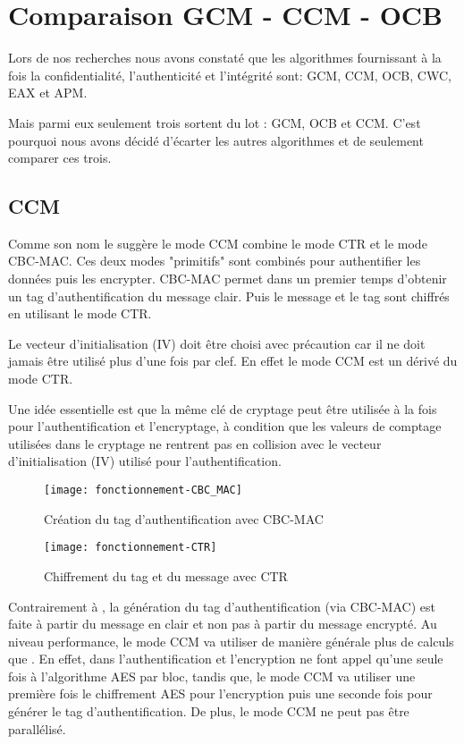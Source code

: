 \chapter{Comparaison GCM - CCM - OCB}

Lors de nos recherches nous avons constaté que les algorithmes fournissant à la fois la confidentialité, l'authenticité et l'intégrité sont: GCM, CCM, OCB, CWC, EAX et APM.

Mais parmi eux seulement trois sortent du lot : GCM, OCB et CCM. C'est pourquoi nous avons décidé d'écarter les autres algorithmes et de seulement comparer ces trois.


\section{CCM}

Comme son nom le suggère le mode CCM combine le mode CTR et le mode CBC-MAC. Ces deux modes "primitifs" sont combinés pour authentifier les données puis les encrypter. CBC-MAC permet dans un premier temps d'obtenir un tag d'authentification du message clair. Puis le message et le tag sont chiffrés en utilisant le mode CTR.



Le vecteur d'initialisation (IV) doit être choisi avec précaution car il ne doit jamais être utilisé plus d'une fois par clef. En effet le mode CCM est un dérivé du mode CTR.



Une idée essentielle est que la même clé de cryptage peut être utilisée à la fois pour l'authentification et l'encryptage, à condition que les valeurs de comptage utilisées dans le cryptage ne rentrent pas en collision avec le vecteur d'initialisation (IV) utilisé pour l'authentification.


\begin{figure}[!h]
  \centering
  \texttt{[image: fonctionnement-CBC\_MAC]}
  \caption{Création du tag d'authentification avec CBC-MAC}
  \label{Création du tag d'authentification avec CBC-MAC}
\end{figure}

\begin{figure}[!h]
  \centering
  \texttt{[image: fonctionnement-CTR]}
  \caption{Chiffrement du tag et du message avec CTR}
  \label{Chiffrement du tag et du message avec CTR}
\end{figure}


Contrairement à \aes, la génération du tag d'authentification (via CBC-MAC) est faite à partir du message en clair et non pas à partir du message encrypté. Au niveau performance, le mode CCM va utiliser de manière générale plus de calculs que \aes. En effet, dans \aes l'authentification et l'encryption ne font appel qu'une seule fois à l'algorithme AES par bloc, tandis que, le mode CCM va utiliser une première fois le chiffrement AES pour l'encryption puis une seconde fois pour générer le tag d'authentification. De plus, le mode CCM ne peut pas être parallélisé.


